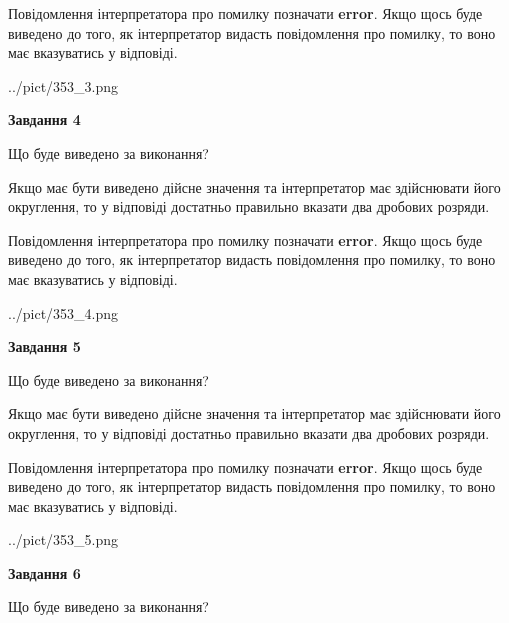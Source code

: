 \documentclass[12pt, ukrainian]{article}
\begin{document}
{\begin {Large}
Повідомлення інтерпретатора про помилку позначати \textbf{error}.
Якщо щось буде виведено до того, як інтерпретатор видасть повідомлення про помилку, 
то воно має вказуватись у відповіді. \par

\begin{center}
	{../pict/353_3.png}
\end{center}
\newpage

{\begin {center}\textbf{Завдання 4}\end {center}}\par
Що буде виведено за виконання? \par

Якщо має бути виведено дійсне значення та інтерпретатор має здійснювати його округлення, 
то у відповіді достатньо правильно вказати два дробових розряди.

Повідомлення інтерпретатора про помилку позначати \textbf{error}.
Якщо щось буде виведено до того, як інтерпретатор видасть повідомлення про помилку, 
то воно має вказуватись у відповіді. \par

\begin{center}
	{../pict/353_4.png}
\end{center}
\newpage

{\begin {center}\textbf{Завдання 5}\end {center}}\par
Що буде виведено за виконання? \par

Якщо має бути виведено дійсне значення та інтерпретатор має здійснювати його округлення, 
то у відповіді достатньо правильно вказати два дробових розряди.

Повідомлення інтерпретатора про помилку позначати \textbf{error}.
Якщо щось буде виведено до того, як інтерпретатор видасть повідомлення про помилку, 
то воно має вказуватись у відповіді. \par

\begin{center}
	{../pict/353_5.png}
\end{center}
\newpage

{\begin {center}\textbf{Завдання 6}\end {center}}\par
Що буде виведено за виконання? \par


\end{Large}}
\end{document}
